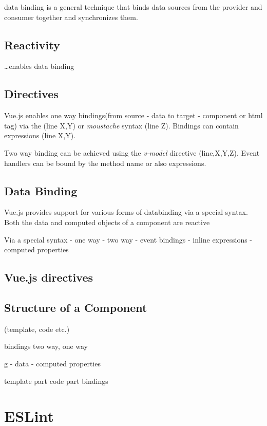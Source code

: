 data binding is a general technique that binds data sources from the provider and consumer together and synchronizes them.


\subsection{Reactivity}


\dots enables data binding
\subsection{Directives}
Vue.js enables one way bindings(from source - data to target - component or html tag) via the  (line X,Y) or \textit{moustache} syntax (line Z). 
Bindings can contain expressions (line X,Y). 

Two way binding can be achieved using the \textit{v-model} directive (line,X,Y,Z). 
Event handlers can be bound by the method name or also expressions.



\subsection{Data Binding}
Vue.js provides support for various forms of \gls{databinding} via a special syntax. Both the data and computed objects of a  component are reactive 


Via a special syntax
- one way
- two way
- event bindings
- inline expressions
- computed properties

\subsection{Vue.js directives}
\subsection{Structure of a Component}

(template, code etc.)

bindings two way, one way

g
- data
- computed properties

template part
code part
bindings


\section{ESLint}

